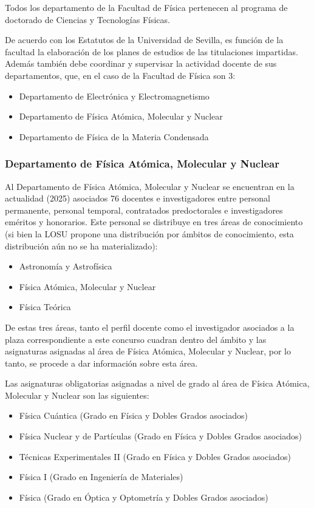 \documentclass[a4paper,12pt,twoside]{article}
\begin{document}
Todos los departamento de la Facultad de Física pertenecen al programa de doctorado de Ciencias y Tecnologías Físicas.

De acuerdo con los Estatutos de la Universidad de Sevilla, es función de la facultad la elaboración de los planes de estudios de las titulaciones impartidas. Además también debe coordinar y supervisar la actividad docente de sus departamentos, que, en el caso de la Facultad de Física son 3:

\begin{itemize}
\item Departamento de Electrónica y Electromagnetismo
\item Departamento de Física Atómica, Molecular y Nuclear
\item Departamento de Física de la Materia Condensada
\end{itemize}

\subsubsection{Departamento de Física Atómica, Molecular y Nuclear}

Al Departamento de Física Atómica, Molecular y Nuclear se encuentran en la actualidad (2025) asociados 76 docentes e investigadores entre personal permanente, personal temporal, contratados predoctorales e investigadores eméritos y honorarios. Este personal se distribuye en tres áreas de conocimiento (si bien la LOSU propone una distribución por ámbitos de conocimiento, esta distribución aún no se ha materializado):

\begin{itemize}
\item Astronomía y Astrofísica
\item Física Atómica, Molecular y Nuclear
\item Física Teórica
\end{itemize}

De estas tres áreas, tanto el perfil docente como el investigador asociados a la plaza correspondiente a este concurso cuadran dentro del ámbito y las asignaturas asignadas al área de Física Atómica, Molecular y Nuclear, por lo tanto, se procede a dar información sobre esta área.

Las asignaturas obligatorias asignadas a nivel de grado al área de Física Atómica, Molecular y Nuclear son las siguientes:

\begin{itemize}
\item Física Cuántica (Grado en Física y Dobles Grados asociados)
\item Física Nuclear y de Partículas (Grado en Física y Dobles Grados asociados)
\item Técnicas Experimentales II (Grado en Física y Dobles Grados asociados)
\item Física I (Grado en Ingeniería de Materiales)
\item Física (Grado en Óptica y Optometría y Dobles Grados asociados)
\end{itemize}
\end{document}
